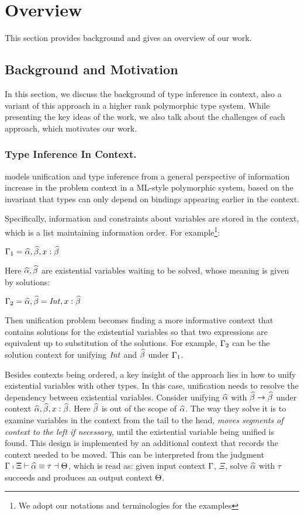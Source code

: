 \section{Overview}
\label{sec:overview}

This section provides background and gives an overview of our work.

\subsection{Background and Motivation}

In this section, we discuss the background of type inference in context, also a
variant of this approach in a higher rank polymorphic type system. While
presenting the key ideas of the work, we also talk about the challenges of each
approach, which motivates our work.

\subsubsection{Type Inference In Context.}

\citet{gundry2010type} models unification and type inference from a general
perspective of information increase in the problem context in a ML-style
polymorphic system, based on the invariant that types can only depend on
bindings appearing earlier in the context.

Specifically, information and constraints about variables are stored in the
context, which is a list maintaining information order. For example\footnote{We
  adopt our notations and terminologies for the examples}:

$\Gamma_1 = \widehat{\alpha}, \widehat{\beta}, x :\widehat{\beta}$

Here $\widehat{\alpha}, \widehat{\beta}$ are existential variables waiting to be solved, whose
meaning is given by solutions:

$\Gamma_2 = \widehat{\alpha}, \widehat{\beta} = \mathit{Int}, x :\widehat{\beta}$

Then unification problem becomes finding a more informative context that
contains solutions for the existential variables so that two expressions are
equivalent up to substitution of the solutions. For
example, $\Gamma_2$ can be the solution context for unifying
$\mathit{Int}$ and $\widehat{\beta}$ under $\Gamma_1$.

Besides contexts being ordered, a key insight of the approach lies in how to
unify existential variables with other types. In this case, unification needs to
resolve the dependency between existential variables. Consider unifying $\widehat{\alpha}$
with $\widehat{\beta} \to \widehat{\beta}$ under context $\widehat{\alpha}, \widehat{\beta}, x : \widehat{\beta}$. Here $\widehat{\beta}$ is
out of the scope of $\widehat{\alpha}$. The way they solve it is to examine variables in
the context from the tail to the head, \textit{moves segments of context to the
  left if necessary}, until the existential variable being unified is found.
This design is implemented by an additional context that records the context
needed to be moved. This can be interpreted from the judgment $\Gamma \shortmid
\Xi \vdash \widehat{\alpha} \equiv \tau \dashv \Theta$, which is read as: given input context
$\Gamma$, $\Xi$, solve $\widehat{\alpha}$ with $\tau$ succeeds and produces an output
context $\Theta$.

